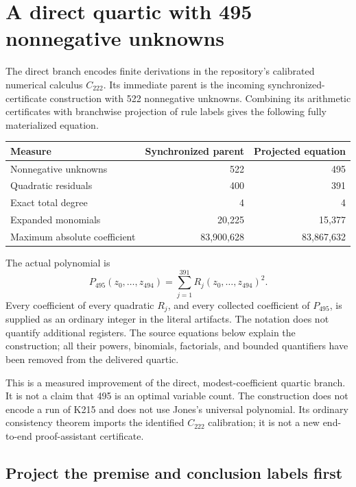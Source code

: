 \section{A direct quartic with 495 nonnegative unknowns}
\label{sec:projected-direct}

The direct branch encodes finite derivations in the repository's calibrated
numerical calculus $C_{222}$.  Its immediate parent is the incoming
synchronized-certificate construction with 522 nonnegative unknowns.
Combining its arithmetic certificates with branchwise projection of rule
labels gives the following fully materialized equation.

\begin{center}
\begin{tabular}{lrr}
\hline
Measure & Synchronized parent & Projected equation\\
\hline
Nonnegative unknowns &522&495\\
Quadratic residuals &400&391\\
Exact total degree &4&4\\
Expanded monomials &20,225&15,377\\
Maximum absolute coefficient &83,900,628&83,867,632\\
\hline
\end{tabular}
\end{center}

The actual polynomial is
\[
 P_{495}(z_0,\ldots,z_{494})=\sum_{j=1}^{391}R_j(z_0,\ldots,z_{494})^2.
\]
Every coefficient of every quadratic $R_j$, and every collected coefficient
of $P_{495}$, is supplied as an ordinary integer in the literal artifacts.
The notation does not quantify additional registers.  The source equations
below explain the construction; all their powers, binomials, factorials,
and bounded quantifiers have been removed from the delivered quartic.

This is a measured improvement of the direct, modest-coefficient quartic
branch.  It is not a claim that 495 is an optimal variable count.  The
construction does not encode a run of K215 and does not use Jones's
universal polynomial.  Its ordinary consistency theorem imports the
identified $C_{222}$ calibration; it is not a new end-to-end proof-assistant
certificate.

\subsection{Project the premise and conclusion labels first}

